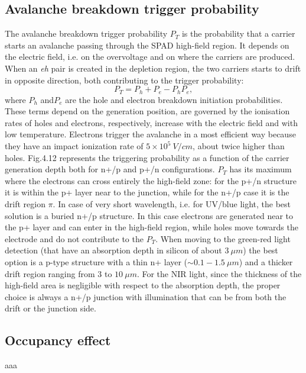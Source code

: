 \subsection*{Avalanche breakdown trigger probability}
The avalanche breakdown trigger probability $P_T$ is the probability that a carrier starts an avalanche passing through the SPAD high-field region.
It depends on the electric field, i.e. on the overvoltage and on where the carriers are produced. When an \textit{eh} pair is created in the depletion region, the two carriers starts to drift in opposite direction, both contributing to the trigger probability:
\begin{equation}
	P_T = P_h + P_e - P_hP_e,
\end{equation}
where $P_h$ and$P_e$ are the hole and electron breakdown initiation probabilities.
These terms depend on the generation position, are governed by the ionisation rates of holes and electrons, respectively, increase with the electric field and with low temperature.
Electrons trigger the avalanche in a most efficient way because they have an impact ionization rate of $5\times 10^5\ V/cm$, about twice higher than holes.
Fig.4.12 represents the triggering probability as a function of the carrier generation depth both for n+/p and p+/n configurations.
$P_T$ has its maximum where the electrons can cross entirely the high-field zone: for the p+/n structure it is within the p+ layer near to the junction, while for the n+/p case it is the drift region $\pi$. In case of very short wavelength, i.e. for UV/blue light, the best solution is a buried n+/p structure. In this case electrons are generated near to the p+ layer and can enter in the high-field region, while holes move towards the electrode and do not contribute to the $P_T$. When moving to the green-red light detection (that have an absorption depth in silicon of about $3\ \mu m$) the best option is a p-type structure with a thin n+ layer ($\sim 0.1-1.5\ \mu m$) and a thicker drift region ranging from $3$ to $10\ \mu m$.
For the NIR light, since the thickness of the high-field area is negligible with respect to the absorption depth, the proper choice is always a n+/p junction with illumination that can be from both the drift or the junction side.\\

\subsection{Occupancy effect}\label{subsec:occupancy_teo}
aaa

